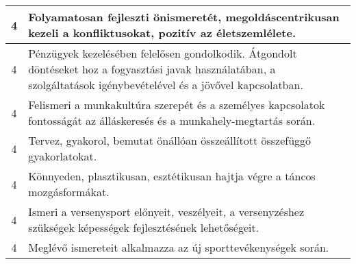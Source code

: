 \begin{longtable}{c | p{12cm} }
                                
                                          4 &  Folyamatosan fejleszti önismeretét, megoldáscentrikusan kezeli a konfliktusokat,  pozitív az életszemlélete. \\ \hline
                                          4 &  Pénzügyek kezelésében felelősen gondolkodik. Átgondolt döntéseket hoz a fogyasztási javak használatában, a szolgáltatások igénybevételével és a jövővel kapcsolatban. \\ \hline
                                          4 &  Felismeri a munkakultúra szerepét és a személyes kapcsolatok fontosságát az álláskeresés és a munkahely-megtartás során. \\ \hline
                                          4 &  Tervez, gyakorol, bemutat önállóan összeállított összefüggő gyakorlatokat. \\ \hline
                                          4 &  Könnyeden, plasztikusan, esztétikusan hajtja végre a táncos mozgásformákat. \\ \hline
                                          4 &  Ismeri a versenysport előnyeit, veszélyeit, a versenyzéshez szükségek képességek fejlesztésének lehetőségeit. \\ \hline
                                          4 &  Meglévő ismereteit alkalmazza az új sporttevékenységek során. \\ \hline
                                      
                        \end{longtable}
            \clearpage

    

